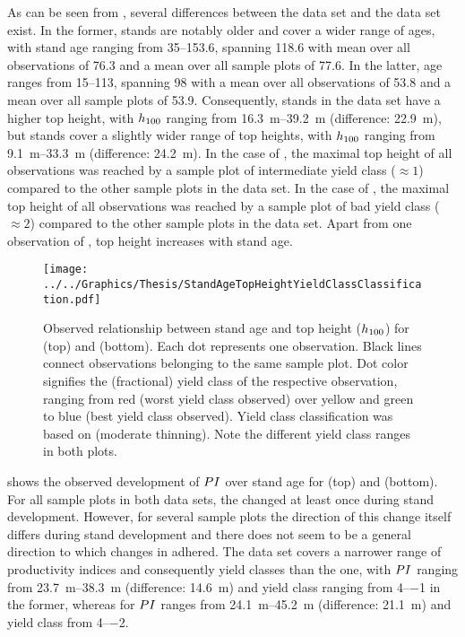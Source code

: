 As can be seen from , several differences between the \Beech{} data set and the \Spruce{} data set exist.  In the former, stands are notably older and cover a wider range of ages, with stand age ranging from \SIrange{35}{153.6}{\year}, spanning \SI{118.6}{\year} with mean over all observations of \SI{76.3}{\year} and a mean over all sample plots of \SI{77.6}{\year}.  In the latter, age ranges from \SIrange{15}{113}{\year}, spanning \SI{98}{\year} with a mean over all observations of \SI{53.8}{\year} and a mean over all sample plots of \SI{53.9}{\year}.  Consequently, stands in the \Beech{} data set have a higher top height, with \(h_{100}\) ranging from \SIrange{16.3}{39.2}{\meter} (difference: \SI{22.9}{\meter}), but \Spruce{} stands cover a slightly wider range of top heights, with \(h_{100}{}\) ranging from \SIrange{9.1}{33.3}{\meter} (difference: \SI{24.2}{\meter}).   In the case of \Beech{}, the maximal top height of all observations was reached by a sample plot of intermediate yield class (\(\approx{} 1\)) compared to the other sample plots in the data set.   In the case of \Spruce{}, the maximal top height of all observations was reached by a sample plot of bad yield class (\(\approx{} 2\)) compared to the other sample plots in the data set.  Apart from one observation of \Beech{}, top height increases with stand age.

\begin{figure}[t]
  \texttt{[image: ../../Graphics/Thesis/StandAgeTopHeightYieldClassClassification.pdf]}
  \caption{Observed relationship between stand age and top height (\(h_{100}\)) for \Beech{} (top) and \Spruce{} (bottom).  Each dot represents one observation.  Black lines connect observations belonging to the same sample plot.  Dot color signifies the (fractional) yield class of the respective observation, ranging from red (worst yield class observed) over yellow and green to blue (best yield class observed).  Yield class classification was based on \textcite{Schober1995} (moderate thinning).  Note the different yield class ranges in both plots.}
  \label{fig:StandAgeTopHeightYieldClassClassification}
\end{figure}

 shows the observed development of \ProductivityIndexText{} \(PI{}\) over stand age for \Beech{} (top) and \Spruce{} (bottom).  For all sample plots in both data sets, the \ProductivityIndexText{} changed at least once during stand development.  However, for several sample plots the direction of this change itself differs during stand development and there does not seem to be a general direction to which changes in \ProductivityIndexText{} adhered.  The \Beech{} data set covers a narrower range of productivity indices and consequently yield classes than the \Spruce{} one, with \(PI{}\) ranging from \SIrange{23.7}{38.3}{\meter} (difference: \SI{14.6}{\meter}) and yield class ranging from \numrange{4}{-1} in the former, whereas for \Spruce{} \(PI{}\) ranges from \SIrange{24.1}{45.2}{\meter} (difference: \SI{21.1}{\meter}) and yield class from \numrange{4}{-2}.

